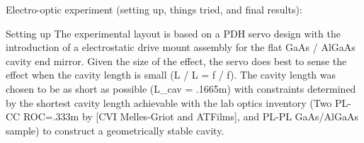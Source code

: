 Electro-optic experiment (setting up, things tried, and final results):

Setting up
The experimental layout is based on a PDH servo design with the introduction of a electrostatic drive mount assembly for the flat GaAs / AlGaAs cavity end mirror. Given the size of the effect, the servo does best to sense the effect when the cavity length is small (\nabla L / L  = \nabla f / f). The cavity length was chosen to be as short as possible (L_cav = .1665m) with constraints determined by the shortest cavity length achievable with the lab optics inventory (Two PL-CC ROC=.333m by [CVI Melles-Griot and ATFilms], and PL-PL GaAs/AlGaAs sample) to construct a geometrically stable cavity. 
